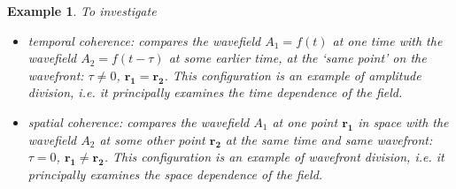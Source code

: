 \documentclass[a4paper]{article}
\newtheorem{eg}{Example}[section]
\theoremstyle{new}
\begin{document}
\begin{eg}
To investigate 
\begin{itemize}
    \item temporal coherence: compares the wavefield $A_1=f(t)$ at one time with the wavefield $A_2=f(t-\tau)$ at some earlier time, at the `same point' on the wavefront: $\tau\neq 0$, $\mathbf{r_1}=\mathbf{r_2}$. This configuration is an example of amplitude division, i.e. it principally examines the time dependence of the field.
    \item spatial coherence: compares the wavefield $A_1$ at one point $\mathbf{r_1}$ in space with the wavefield $A_2$ at some other point $\mathbf{r_2}$ at the same time and same wavefront: $\tau=0$, $\mathbf{r_1}\neq\mathbf{r_2}$. This configuration is an example of wavefront division, i.e. it principally examines the space dependence of the field.
\end{itemize}
\end{eg}
\newpage
\end{document}
